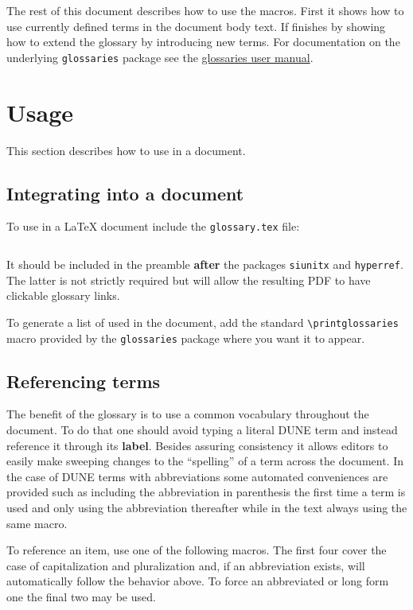 \documentclass{article}
\begin{document}
The rest of this document describes how to use the 
macros.   
First it shows how to use currently defined terms in the document body
text. 
If finishes by showing how to extend the glossary by introducing new
terms.
For documentation on the underlying \texttt{glossaries} package see
the
\href{mirrors.ctan.org/macros/latex/contrib/glossaries/glossaries-user.pdf}{glossaries
  user manual}.


\section{Usage}

This section describes how to use  in a document. 

\subsection{Integrating into a document}

To use  in a \LaTeX{} document include the
\texttt{glossary.tex} file:
\begin{verbatim}

\end{verbatim}
It should be included in the preamble \textbf{after} the packages
\texttt{siunitx} and \texttt{hyperref}. 
The latter is not strictly required but will allow the resulting PDF
to have clickable glossary links. 

To generate a list of  used in the document, add the
standard \verb|\printglossaries| macro provided by the
\texttt{glossaries} package where you want it to appear.

\subsection{Referencing terms}
\label{sec:referencing}

The benefit of the glossary is to use a common vocabulary throughout
the document. 
To do that one should avoid typing a literal DUNE term and instead
reference it through its \textbf{label}. 
Besides assuring consistency it allows editors to easily make sweeping
changes to the ``spelling'' of a term across the document. 
In the case of DUNE terms with abbreviations some automated
conveniences are provided such as including the abbreviation in
parenthesis the first time a term is used and only using the
abbreviation thereafter while in the text always using the same macro.

To reference an item, use one of the following macros. 
The first four cover the case of capitalization and pluralization and,
if an abbreviation exists, will automatically follow the behavior
above. 
To force an abbreviated or long form one the final two may be used.
\end{document}
